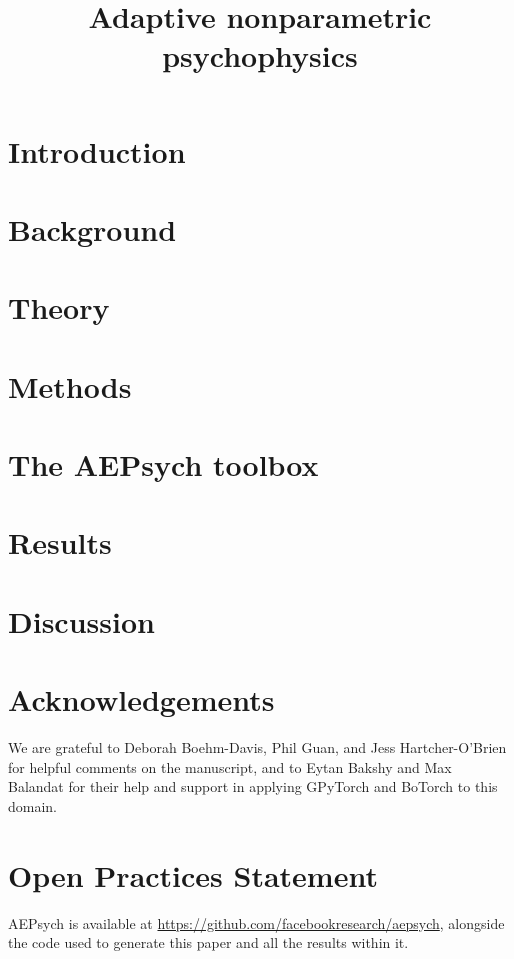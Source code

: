 \documentclass[man,floatsintext]{apa6}
\title{Adaptive nonparametric psychophysics}
\begin{document}
\maketitle


\section{Introduction}


\section{Background}


\section{Theory}


\section{Methods}


\section{The AEPsych toolbox}


\section{Results}


\section{Discussion}



\section{Acknowledgements}
We are grateful to Deborah Boehm-Davis, Phil Guan, and Jess Hartcher-O'Brien for helpful comments on the manuscript, and to Eytan Bakshy and Max Balandat for their help and support in applying GPyTorch and BoTorch to this domain.

\section{Open Practices Statement}
AEPsych is available at \url{https://github.com/facebookresearch/aepsych}, alongside the code used to generate this paper and all the results within it.

\clearpage
\printbibliography[]
\end{document}
